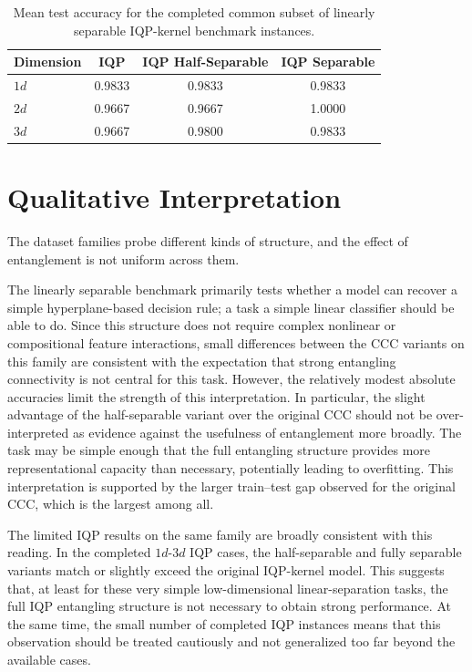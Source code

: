 \documentclass[12pt,a4paper,openany]{report}
\begin{document}
\begin{table}[htbp]
    \centering
    \small
    \begin{tabular}{lccc}
        \hline
        Dimension & IQP & IQP Half-Separable & IQP Separable \\
        \hline
        \(1d\) & 0.9833 & 0.9833 & 0.9833 \\
        \(2d\) & 0.9667 & 0.9667 & 1.0000 \\
        \(3d\) & 0.9667 & 0.9800 & 0.9833 \\
        \hline
    \end{tabular}
    \caption{Mean test accuracy for the completed common subset of linearly separable IQP-kernel benchmark instances.}
    \label{tab:iqp-linsep-small}
\end{table}

\section{Qualitative Interpretation}

The dataset families probe different kinds of structure, and the effect of entanglement is not uniform across them.

The linearly separable benchmark primarily tests whether a model can recover a simple hyperplane-based decision rule; a task a simple linear classifier should be able to do. Since this structure does not require complex nonlinear or compositional feature interactions, small differences between the CCC variants on this family are consistent with the expectation that strong entangling connectivity is not central for this task. However, the relatively modest absolute accuracies limit the strength of this interpretation. In particular, the slight advantage of the half-separable variant over the original CCC should not be over-interpreted as evidence against the usefulness of entanglement more broadly. The task may be simple enough that the full entangling structure provides more representational capacity than necessary, potentially leading to overfitting. This interpretation is supported by the larger train--test gap observed for the original CCC, which is the largest among all.

The limited IQP results on the same family are broadly consistent with this reading. In the completed \(1d\)-\(3d\) IQP cases, the half-separable and fully separable variants match or slightly exceed the original IQP-kernel model. This suggests that, at least for these very simple low-dimensional linear-separation tasks, the full IQP entangling structure is not necessary to obtain strong performance. At the same time, the small number of completed IQP instances means that this observation should be treated cautiously and not generalized too far beyond the available cases.
\end{document}
